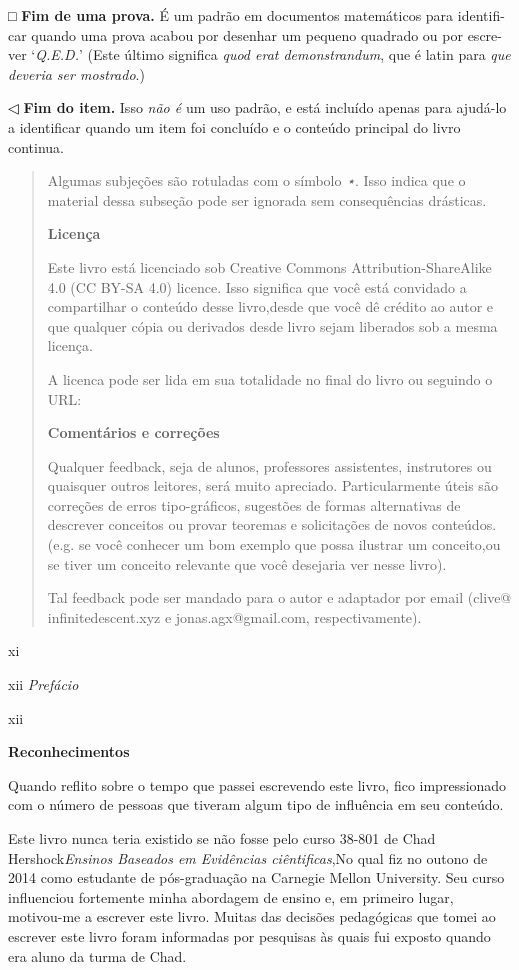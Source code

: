 \documentclass[
]{article}
\begin{document}
□ \textbf{Fim de uma prova.} É um padrão em documentos matemáticos para
identifi- car quando uma prova acabou por desenhar um pequeno quadrado
ou por escre- ver `\emph{Q.E.D.}' (Este último significa \emph{quod erat
demonstrandum}, que é latin para \emph{que} \emph{deveria ser
mostrado}.)

◁ \textbf{Fim do item.} Isso \emph{não é} um uso padrão, e está incluído
apenas para ajudá-lo a identificar quando um item foi concluído e o
conteúdo principal do livro continua.

\begin{quote}
Algumas subjeções são rotuladas com o símbolo \emph{⋆}. Isso indica que
o material dessa subseção pode ser ignorada sem consequências drásticas.

\textbf{Licença}

Este livro está licenciado sob Creative Commons Attribution-ShareAlike
4.0 (CC BY-SA 4.0) licence. Isso significa que você está convidado a
compartilhar o conteúdo desse livro,desde que você dê crédito ao autor e
que qualquer cópia ou derivados desde livro sejam liberados sob a mesma
licença.

A licenca pode ser lida em sua totalidade no final do livro ou seguindo
o URL:

\textbf{Comentários e correções}

Qualquer feedback, seja de alunos, professores assistentes, instrutores
ou quaisquer outros leitores, será muito apreciado. Particularmente
úteis são correções de erros tipo-gráficos, sugestões de formas
alternativas de descrever conceitos ou provar teoremas e solicitações de
novos conteúdos. (e.g. se você conhecer um bom exemplo que possa
ilustrar um conceito,ou se tiver um conceito relevante que você
desejaria ver nesse livro).

Tal feedback pode ser mandado para o autor e adaptador por email (clive@
infinitedescent.xyz e jonas.agx@gmail.com, respectivamente).
\end{quote}

xi

xii \emph{Prefácio}

xii

\textbf{Reconhecimentos}

Quando reflito sobre o tempo que passei escrevendo este livro, fico
impressionado com o número de pessoas que tiveram algum tipo de
influência em seu conteúdo.

Este livro nunca teria existido se não fosse pelo curso 38-801 de Chad
Hershock\emph{Ensinos Baseados em Evidências ciêntificas},No qual fiz no
outono de 2014 como estudante de pós-graduação na Carnegie Mellon
University. Seu curso influenciou fortemente minha abordagem de ensino
e, em primeiro lugar, motivou-me a escrever este livro. Muitas das
decisões pedagógicas que tomei ao escrever este livro foram informadas
por pesquisas às quais fui exposto quando era aluno da turma de Chad.
\end{document}
